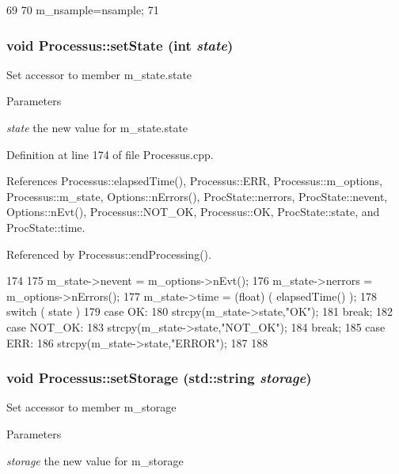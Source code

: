 \begin{DoxyCode}
69                              {
70     m_nsample=nsample;
71   }
\end{DoxyCode}
\hypertarget{classProcessus_ad38cde0f1bcefa00b068e7947b8af927}{
\subsubsection[{setState}]{\setlength{\rightskip}{0pt plus 5cm}void Processus::setState (int {\em state})}}
\label{classProcessus_ad38cde0f1bcefa00b068e7947b8af927}
Set accessor to member m\_\-state.state 
\begin{DoxyParams}{Parameters}
\item[{\em state}]the new value for m\_\-state.state \end{DoxyParams}


Definition at line 174 of file Processus.cpp.

References Processus::elapsedTime(), Processus::ERR, Processus::m\_\-options, Processus::m\_\-state, Options::nErrors(), ProcState::nerrors, ProcState::nevent, Options::nEvt(), Processus::NOT\_\-OK, Processus::OK, ProcState::state, and ProcState::time.

Referenced by Processus::endProcessing().


\begin{DoxyCode}
174                                      {
175   m_state->nevent  = m_options->nEvt();
176   m_state->nerrors = m_options->nErrors();
177   m_state->time    = (float) ( elapsedTime() );
178   switch ( state ){
179   case OK:
180     strcpy(m_state->state,"OK");
181     break;
182   case NOT_OK:
183     strcpy(m_state->state,"NOT_OK");
184     break;
185   case ERR:
186     strcpy(m_state->state,"ERROR");
187   }
188 }
\end{DoxyCode}
\hypertarget{classProcessus_ad57a29b33f9021eda9f6929136f1784f}{
\subsubsection[{setStorage}]{\setlength{\rightskip}{0pt plus 5cm}void Processus::setStorage (std::string {\em storage})}}
\label{classProcessus_ad57a29b33f9021eda9f6929136f1784f}
Set accessor to member m\_\-storage 
\begin{DoxyParams}{Parameters}
\item[{\em storage}]the new value for m\_\-storage \end{DoxyParams}


